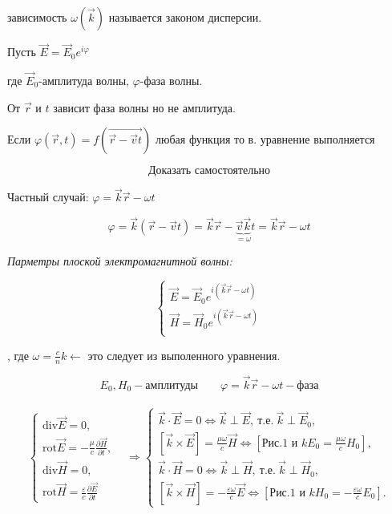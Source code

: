 зависимость \( \omega (\vec{k}) \)  называется законом дисперсии.

Пусть \( \vec{E}=\vec{E}_0 e^{i\varphi}\)

где \( \vec{E}_0 \)-амплитуда волны, \( \varphi \)-фаза волны.

От \( \vec{r} \) и \( t \) зависит фаза волны но не амплитуда.

Если \(\varphi(\vec{r},t)=f(\vec{\vec{r}-\vec{v}t}) \) любая функция то в. уравнение выполняется 

\[
\boxed{\text{Доказать самостоятельно}}
\]

Частный случай: \( \varphi=\vec{k}\vec{r}-\omega t \) 

\[
\varphi=\vec{k}(\vec{r}-\vec{v}t)=\vec{k}\vec{r}-\underbrace{\vec{v}\vec{k}}_{=\omega}t=\vec{k}\vec{r}-\omega t 
\]

\textit{Парметры плоской электромагнитной волны:}

\[
\begin{cases}
    \vec{E}=\vec{E}_0e^{i(\vec{k}\vec{r}-\omega t)} \\
    \vec{H}=\vec{H}_0e^{i(\vec{k}\vec{r}-\omega t)} \\
\end{cases}
\]

, где \( \omega=\frac{c}{n}k \leftarrow  \) это следует из выполенного уравнения.

\[
E_0,H_0 -\text{амплитуды}   \qquad \varphi=\vec{k}\vec{r}-\omega t - \text{фаза}
\]

\[
\begin{aligned}
    \begin{array}{rl}
        \begin{cases}
            \mathrm{div}\vec{E} = 0, \\
            \mathrm{rot}\vec{E} = -\frac{\mu}{c} \frac{\partial \vec{H}}{\partial t}, \\
            \mathrm{div}\vec{H} = 0, \\
            \mathrm{rot}\vec{H} = \frac{\varepsilon}{c} \frac{\partial \vec{E}}{\partial t}
        \end{cases} 
        & \Rightarrow
        \begin{cases}
            \vec{k} \cdot \vec{E} = 0 \Leftrightarrow \vec{k} \perp \vec{E},\ \text{т.е.}\ \vec{k} \perp \vec{E}_0, \\
            [\vec{k} \times \vec{E}] = \frac{\mu\omega}{c} \vec{H} \Leftrightarrow [\text{Рис.1 и } kE_0 = \frac{\mu\omega}{c}H_0], \\
            \vec{k} \cdot \vec{H} = 0 \Leftrightarrow \vec{k} \perp \vec{H},\ \text{т.е.}\ \vec{k} \perp \vec{H}_0, \\
            [\vec{k} \times \vec{H}] = -\frac{\varepsilon\omega}{c} \vec{E} \Leftrightarrow [\text{Рис.1 и } kH_0 = -\frac{\varepsilon\omega}{c}E_0].
        \end{cases}
    \end{array}
\end{aligned}
\]

